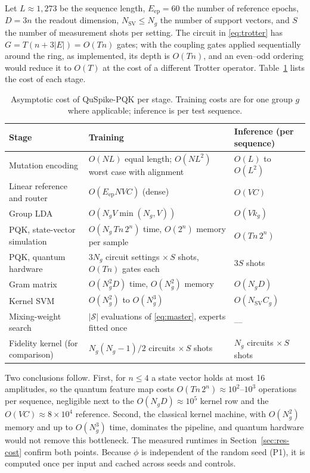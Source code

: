 \documentclass[conference]{IEEEtran}
\begin{document}
Let $L\approx1{,}273$ be the sequence length, $E_{\mathrm{ep}}=60$ the number of reference epochs, $D=3n$ the readout dimension, $N_{\mathrm{SV}}\le N_g$ the number of support vectors, and $S$ the number of measurement shots per setting. The circuit in \eqref{eq:trotter} has $G=T(n+3|E|)=O(Tn)$ gates; with the coupling gates applied sequentially around the ring, as implemented, its depth is $O(Tn)$, and an even--odd ordering would reduce it to $O(T)$ at the cost of a different Trotter operator. Table~\ref{tab:complexity} lists the cost of each stage.

\begin{table}[!t]
    \centering
    \caption{Asymptotic cost of QuSpike-PQK per stage. Training costs are for one group $g$ where applicable; inference is per test sequence.}
    \label{tab:complexity}
    \footnotesize
    \setlength{\tabcolsep}{5pt}
    \renewcommand{\arraystretch}{1.15}
    \begin{tabular*}{\textwidth}{@{\extracolsep{\fill}}lll@{}}
        \toprule
        Stage & Training & Inference (per sequence) \\
        \midrule
        Mutation encoding & $O(NL)$ equal length; $O(NL^2)$ worst case with alignment & $O(L)$ to $O(L^2)$ \\
        Linear reference and router & $O(E_{\mathrm{ep}}NVC)$ (dense) & $O(VC)$ \\
        Group LDA & $O(N_gV\min(N_g,V))$ & $O(Vk_g)$ \\
        PQK, state-vector simulation & $O(N_g\,Tn\,2^{n})$ time, $O(2^n)$ memory per sample & $O(Tn\,2^{n})$ \\
        PQK, quantum hardware & $3N_g$ circuit settings $\times\,S$ shots, $O(Tn)$ gates each & $3S$ shots \\
        Gram matrix & $O(N_g^2D)$ time, $O(N_g^2)$ memory & $O(N_gD)$ \\
        Kernel SVM & $O(N_g^2)$ to $O(N_g^3)$ & $O(N_{\mathrm{SV}}C_g)$ \\
        Mixing-weight search & $|\mathcal{S}|$ evaluations of \eqref{eq:master}, experts fitted once & --- \\
        \midrule
        Fidelity kernel (for comparison) & $N_g(N_g-1)/2$ circuits $\times\,S$ shots & $N_g$ circuits $\times\,S$ shots \\
        \bottomrule
    \end{tabular*}
\end{table}

Two conclusions follow. First, for $n\le4$ a state vector holds at most 16 amplitudes, so the quantum feature map costs $O(Tn\,2^n)\approx10^2$--$10^3$ operations per sequence, negligible next to the $O(N_gD)\approx10^5$ kernel row and the $O(VC)\approx8\times10^4$ reference. Second, the classical kernel machine, with $O(N_g^2)$ memory and up to $O(N_g^3)$ time, dominates the pipeline, and quantum hardware would not remove this bottleneck. The measured runtimes in Section~\ref{sec:res-cost} confirm both points. Because $\phi$ is independent of the random seed (P1), it is computed once per input and cached across seeds and controls.
\end{document}
